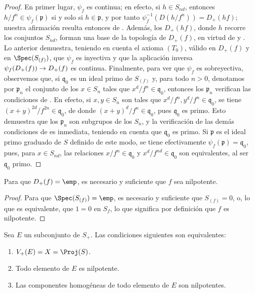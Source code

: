 \documentclass[oneside,10pt]{amsart}
\makeatletter
\newcommand{\ega@arrow}[2]{\mathchoice{#1}{#2}{#2}{#2}}
\renewcommand{\to}{\ega@arrow{\longrightarrow}{\rightarrow}}
\newcommand{\oldpage}[2][]{\marginnote{\normalfont\footnotesize\textbf{#1}~|~#2}\ignorespaces}
\let\EGAOriginalLabel\label
\renewcommand{\label}[1]{\phantomsection\EGAOriginalLabel{#1}}
\makeatother
\begin{document}
\begin{proof}
En primer lugar, $\psi_f$ es continua; en efecto, si $h\in S_{nd}$, entonces $h/f^n\in\psi_f(\mathfrak{p})$ si y solo si $h\in\mathfrak{p}$, y por tanto $\psi_f^{-1}(D(h/f^n))=D_+(hf)$; nuestra afirmación resulta entonces de .
Además, los $D_+(hf)$, donde $h$ recorre los conjuntos $S_{nd}$, forman una base de la topología de $D_+(f)$, en virtud de  y .
Lo
\oldpage[II]{27}
anterior demuestra, teniendo en cuenta el axioma $(T_0)$, válido en $D_+(f)$ y en $\Spec(S_{(f)})$, que $\psi_f$ es inyectiva y que la aplicación inversa $\psi_f(D_+(f))\to D_+(f)$ es continua.
Finalmente, para ver que $\psi_f$ es sobreyectiva, observemos que, si $\mathfrak{q}_0$ es un ideal primo de $S_{(f)}$ y, para todo $n>0$, denotamos por $\mathfrak{p}_n$ el conjunto de los $x\in S_n$ tales que $x^d/f^n\in\mathfrak{q}_0$, entonces los $\mathfrak{p}_n$ verifican las condiciones de .
En efecto, si $x,y\in S_n$ son tales que $x^d/f^n,y^d/f^n\in\mathfrak{q}_0$, se tiene $(x+y)^{2d}/f^{2n}\in\mathfrak{q}_0$, de donde $(x+y)^d/f^n\in\mathfrak{q}_0$, pues $\mathfrak{q}_0$ es primo.
Esto demuestra que los $\mathfrak{p}_n$ son subgrupos de los $S_n$, y la verificación de las demás condiciones de  es inmediata, teniendo en cuenta que $\mathfrak{q}_0$ es primo.
Si $\mathfrak{p}$ es el ideal primo graduado de $S$ definido de este modo, se tiene efectivamente $\psi_f(\mathfrak{p})=\mathfrak{q}_0$, pues, para $x\in S_{nd}$, las relaciones $x/f^n\in\mathfrak{q}_0$ y $x^d/f^{nd}\in\mathfrak{q}_0$ son equivalentes, al ser $\mathfrak{q}_0$ primo.
\end{proof}

\begin{corollary}[2.3.7]
\label{II.2.3.7}
Para que $D_+(f)=\emp$, es necesario y suficiente que $f$ sea nilpotente.
\end{corollary}

\begin{proof}
Para que $\Spec(S_{(f)})=\emp$, es necesario y suficiente que $S_{(f)}=0$, o, lo que es equivalente, que $1=0$ en $S_f$, lo que significa por definición que $f$ es nilpotente.
\end{proof}

\begin{corollary}[2.3.8]
\label{II.2.3.8}
Sea $E$ un subconjunto de $S_+$.
Las condiciones siguientes son equivalentes:
\begin{enumerate}
  \item[\textit{(a)}] $V_+(E)=X=\Proj(S)$.
  \item[\textit{(b)}] Todo elemento de $E$ es nilpotente.
  \item[\textit{(c)}] Las componentes homogéneas de todo elemento de $E$ son nilpotentes.
\end{enumerate}
\end{corollary}
\end{document}
